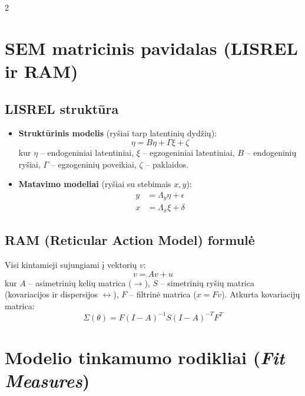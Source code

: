 \documentclass[9pt,a4paper]{article}
\begin{document}
\begin{multicols*}{2}
\section{SEM matricinis pavidalas (LISREL ir RAM)}

\subsection{LISREL struktūra}
\begin{itemize}
    \item \textbf{Struktūrinis modelis} (ryšiai tarp latentinių dydžių):
    \begin{equation*}
        \eta = B \eta + \Gamma \xi + \zeta
    \end{equation*}
    kur $\eta$ -- endogeniniai latentiniai, $\xi$ -- egzogeniniai latentiniai, $B$ -- endogeninių ryšiai, $\Gamma$ -- egzogeninių poveikiai, $\zeta$ -- paklaidos.
    \item \textbf{Matavimo modeliai} (ryšiai su stebimais $x, y$):
    \begin{align*}
        y &= \Lambda_y \eta + \epsilon \\
        x &= \Lambda_x \xi + \delta
    \end{align*}
\end{itemize}

\subsection{RAM (Reticular Action Model) formulė}
Visi kintamieji sujungiami į vektorių $v$:
\begin{equation*}
    v = A v + u
\end{equation*}
kur $A$ -- asimetrinių kelių matrica ($\to$), $S$ -- simetrinių ryšių matrica (kovariacijos ir dispersijos $\leftrightarrow$), $F$ -- filtrinė matrica ($x = F v$).
Atkurta kovariacijų matrica:
\begin{equation*}
    \Sigma(\theta) = F (I - A)^{-1} S (I - A)^{-T} F^T
\end{equation*}

\section{Modelio tinkamumo rodikliai (\textit{Fit Measures})}


\end{multicols*}
\end{document}
